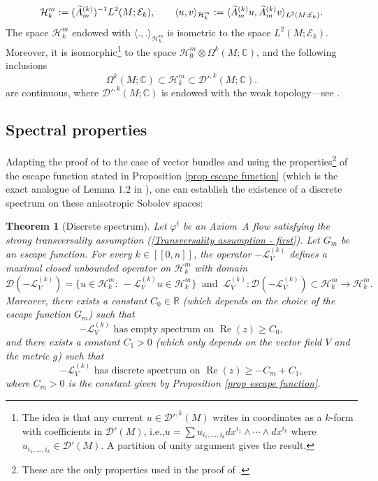 \documentclass[11pt]{article}
\newcommand{\ie}{i.e.,\xspace}
\newcommand{\lcr}{[\![}
\newcommand{\rcr}{]\!]}
\theoremstyle{definition}
\theoremstyle{plain}
\newtheorem{thm}{Theorem}
\newcommand{\A}{\emph{A}}
\newcommand{\C}{\mathbb{C}}
\newcommand{\D}{\mathcal{D}}
\newcommand{\Ecal}{\mathcal{E}}
\newcommand{\Hil}{\mathcal{H}}
\newcommand{\Lie}{\mathcal{L}}
\newcommand{\R}{\mathbb{R}}
\newcommand{\w}[1]{\langle {#1} \rangle}
\DeclareMathOperator{\re}{Re}
\begin{document}
\[
\Hil_k^{m}:= (\widetilde{\A}{}_m^{(k)})^{-1} L^2 (M; \Ecal_k), \qquad \w{u,v}_{\Hil_k^m}:= \w{\widetilde{\A}{}_m^{(k)} u, \widetilde{\A}{}_m^{(k)} v}_{L^2 (M;\Ecal_k)}.
\]
The space $\Hil_k^m$ endowed with $\w{.,.}_{\Hil_k^m}$ is isometric to the space $L^2 (M; \Ecal_k)$. Moreover, it is isomorphic\footnote{The idea is that any current $u \in \D'^{,k}(M)$ writes in coordinates as a $k$-form with coefficients in $\D'(M)$, \ie $u = \sum u_{i_1,\dots, i_k} dx^{i_1} \wedge \cdots \wedge dx^{i_k}$ where $u_{i_1,\dots, i_k} \in \D' (M)$. A partition of unity argument gives the result.} to the space $\Hil_0^m \otimes \Omega^k (M; \C)$, and the following inclusions
\[
\Omega^k (M; \C) \subset \Hil_k^m \subset \D'^{,k} (M ;\C).
\]
are continuous, where $\D'^{,k} (M; \C)$ is endowed with the weak topology---see \cite{schwartz}.

\subsection{Spectral properties}

Adapting the proof of \cite[Th.\,1.4]{FS} to the case of vector bundles and using the properties\footnote{These are the only properties used in the proof of \cite{FS}.} of the escape function stated in Proposition \ref{prop escape function} (which is the exact analogue of Lemma $1.2$ in \cite{FS}), one can establish the existence of a discrete spectrum on these anisotropic Sobolev spaces:

\begin{thm}[Discrete spectrum]\label{thm: discrete sprectrum} Let $\varphi^t$ be an Axiom~A flow satisfying the strong transversality assumption (\ref{Transversality assumption - first}). Let $G_m$ be an escape function. For every $k\in\lcr0,n\rcr$, the operator $-\Lie_V^{(k)}$ defines a maximal closed unbounded operator on $\Hil_k^m$ with domain
\[
\D (-\Lie_V^{(k)}) = \{u \in \Hil_k^m: \: -\Lie_V^{(k)} u \in \Hil_k^m \} \: \text{ and } \: \Lie_V^{(k)}: \D (-\Lie_V^{(k)}) \subset \Hil_k^m \to \Hil_k^m.
\]
Moreover, there exists a constant $C_0 \in \R$ (which depends on the choice of the escape function $G_m$) such that
\[
-\Lie_V^{(k)} \text{ has empty spectrum on } \re (z) \geq C_0,
\]
and there exists a constant $C_1 > 0$ (which only depends on the vector field $V$ and the metric $g$) such that
\[
-\Lie_V^{(k)} \text{ has discrete spectrum on } \re (z) \geq -C_m + C_1,
\]
where $C_m>0$ is the constant given by Proposition \ref{prop escape function}.
\end{thm}
\end{document}
